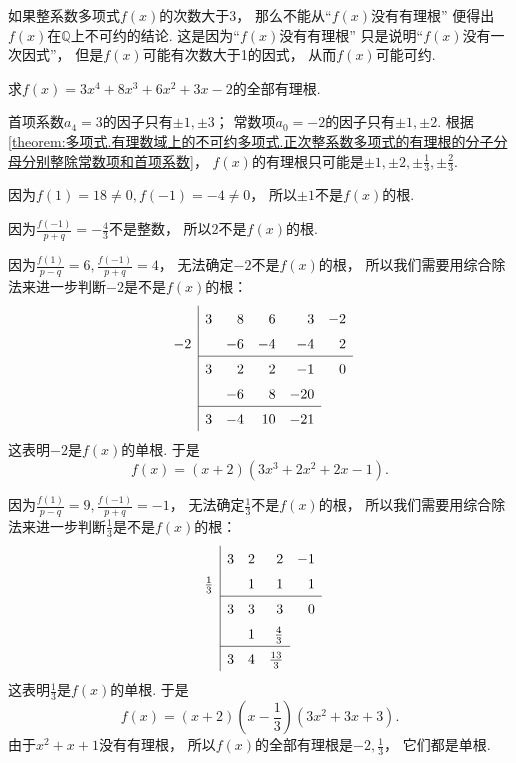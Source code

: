 \begin{remark}
如果整系数多项式\(f(x)\)的次数大于3，
那么不能从“\(f(x)\)没有有理根”
便得出\(f(x)\)在\(\mathbb{Q}\)上不可约的结论.
这是因为“\(f(x)\)没有有理根”
只是说明“\(f(x)\)没有一次因式”，
但是\(f(x)\)可能有次数大于1的因式，
从而\(f(x)\)可能可约.
\end{remark}

\begin{example}
求\(f(x)=3x^4+8x^3+6x^2+3x-2\)的全部有理根.
\begin{solution}
首项系数\(a_4=3\)的因子只有\(\pm1,\pm3\)；
常数项\(a_0=-2\)的因子只有\(\pm1,\pm2\).
根据\cref{theorem:多项式.有理数域上的不可约多项式.正次整系数多项式的有理根的分子分母分别整除常数项和首项系数}，
\(f(x)\)的有理根只可能是\(\pm1,\pm2,\pm\frac13,\pm\frac23\).

因为\(f(1)=18\neq0,
f(-1)=-4\neq0\)，
所以\(\pm1\)不是\(f(x)\)的根.

因为\(\frac{f(-1)}{p+q}=-\frac43\)不是整数，
所以\(2\)不是\(f(x)\)的根.

因为\(\frac{f(1)}{p-q}=6,
\frac{f(-1)}{p+q}=4\)，
无法确定\(-2\)不是\(f(x)\)的根，
所以我们需要用综合除法来进一步判断\(-2\)是不是\(f(x)\)的根：\[
	\begin{array}{r|*5r}
		& 3 & 8 & 6 & 3 & -2 \\
		-2 && -6 & -4 & -4 & 2 \\ \cline{2-6}
		& 3 & 2 & 2 & -1 & 0 \\
		&& -6 & 8 & -20 \\ \cline{2-5}
		& 3 & -4 & 10 & -21
	\end{array}
\]
这表明\(-2\)是\(f(x)\)的单根.
于是\[
	f(x)=(x+2)(3x^3+2x^2+2x-1).
\]

因为\(\frac{f(1)}{p-q}=9,
\frac{f(-1)}{p+q}=-1\)，
无法确定\(\frac13\)不是\(f(x)\)的根，
所以我们需要用综合除法来进一步判断\(\frac13\)是不是\(f(x)\)的根：\[
	\def\arraystretch{1.5}
	\begin{array}{r|*5r}
		& 3 & 2 & 2 & -1 \\
		\frac13 && 1 & 1 & 1 \\ \cline{2-5}
		& 3 & 3 & 3 & 0 \\
		&& 1 & \frac43 \\ \cline{2-4}
		& 3 & 4 & \frac{13}3
	\end{array}
\]
这表明\(\frac13\)是\(f(x)\)的单根.
于是\[
	f(x)=(x+2)\left(x-\frac13\right)
	(3x^2+3x+3).
\]
由于\(x^2+x+1\)没有有理根，
所以\(f(x)\)的全部有理根是\(-2,\frac13\)，
它们都是单根.
\end{solution}
\end{example}
